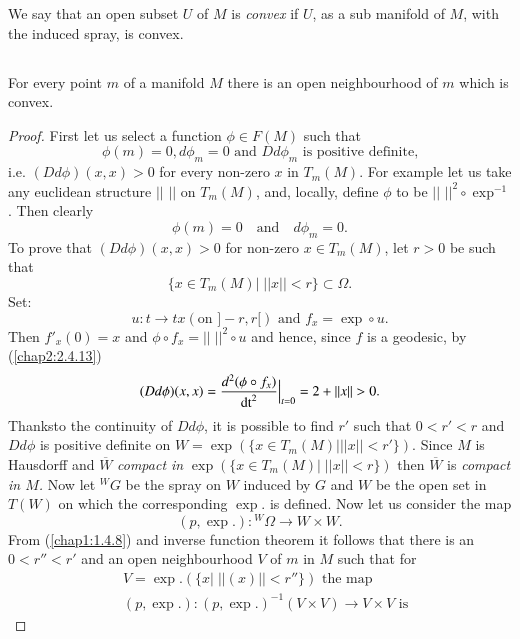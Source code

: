 \begin{defi*}
We say that an open subset $U$ of $M$ is {\em convex} if $U$, as a
sub manifold of $M$, with the induced spray, is convex.
\end{defi*}

\subsection{}\label{chap2:2.6.8}

\begin{theorem*}
For every point $m$ of a manifold $M$ there is an open neighbourhood
of $m$ which is convex.
\end{theorem*}

\begin{proof}
First let us select a function $\phi\in F(M)$ such that
$$
\phi(m)=0, d\phi_{m}=0\text{ \ and \ } Dd\phi_{m}\text{ \ is positive
  definite,} 
$$
i.e. $(Dd\phi)(x,x)>0$ for every non-zero $x$ in $T_{m}(M)$. For
example let us take any euclidean structure $||$ $||$ on $T_{m}(M)$,
and, locally, define $\phi$ to be $||$ $||^{2}\circ \exp^{-1}$. Then
  clearly
$$
\phi(m)=0\quad\text{and}\quad d\phi_{m}=0.
$$
To prove that $(Dd\phi)(x,x)>0$ for non-zero $x\in T_{m}(M)$, let
$r>0$ be such that
$$
\{x\in T_{m}(M)|\; ||x||< r\}\subset \Omega.
$$
Set:
$$
u:t\to tx(\text{on }]-r, r[)\text{ \ and \ } f_{x}=\exp\circ u.
$$
Then $f'_{x}(0)=x$ and $\phi\circ f_{x}=||\; ||^{2}\circ u$ and hence,
since $f$ is a geodesic, by (\ref{chap2:2.4.13})
\begin{equation*}
(Dd\phi)(x,x)=\frac{d^{2}(\phi\circ
    f_{x})}{\dt^{2}}\Big|_{t=0}=2+||x||>0.
\end{equation*}
Thanks\pageoriginale to the continuity of $Dd\phi$, it is possible to
find $r'$ such that $0<r'<r$ and $Dd\phi$ is positive definite on
$W=\exp(\{x\in T_{m}(M)\big| ||x||<r'\})$. Since $M$ is Hausdorff and
$\overline{W}$ {\em compact in} $\exp(\{x\in T_{m}(M)\big|\;
||x||<r\})$ then $\overline{W}$ is {\em compact in $M$.} Now let
${}^{W}G$ be the spray on $W$ induced by $G$ and $W$ be the open set
in $T(W)$ on which the corresponding $\exp.$ is defined. Now let us
consider the map
$$
(p,\exp.):{}^{W}\Omega\to W\times W.
$$
From (\ref{chap1:1.4.8}) and inverse function theorem it follows that
there is an $0<r''<r'$ and an open neighbourhood $V$ of $m$ in $M$
such that for
\begin{align*}
& V=\exp.(\{x\big|\; ||(x)||<r''\})\text{ \  the map}\\
& (p,\exp.):(p,\exp.)^{-1}(V\times V)\to V\times V\text{ \ is}

\end{align*}
\end{proof}
